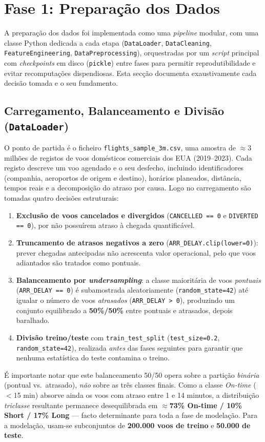 \documentclass[conference]{IEEEtran}
\begin{document}
\section{Fase 1: Preparação dos Dados}
\label{sec:fase1}

A preparação dos dados foi implementada como uma \textit{pipeline} modular,
com uma classe Python dedicada a cada etapa (\texttt{DataLoader},
\texttt{DataCleaning}, \texttt{FeatureEngineering}, \texttt{DataPreprocessing}),
orquestradas por um \textit{script} principal com \textit{checkpoints} em
disco (\texttt{pickle}) entre fases para permitir reprodutibilidade e evitar
recomputações dispendiosas. Esta secção documenta exaustivamente cada decisão
tomada e o seu fundamento.

\subsection{Carregamento, Balanceamento e Divisão (\texttt{DataLoader})}
O ponto de partida é o ficheiro \texttt{flights\_sample\_3m.csv}, uma amostra de
$\approx$3 milhões de registos de voos domésticos comerciais dos EUA
(2019–2023). Cada registo descreve um voo agendado e o seu desfecho, incluindo
identificadores (companhia, aeroportos de origem e destino), horários
planeados, distância, tempos reais e a decomposição do atraso por causa. Logo no
carregamento são tomadas quatro decisões estruturais:
\begin{enumerate}
\item \textbf{Exclusão de voos cancelados e divergidos}
      (\texttt{CANCELLED == 0} e \texttt{DIVERTED == 0}), por não possuírem
      atraso à chegada quantificável.
\item \textbf{Truncamento de atrasos negativos a zero}
      (\texttt{ARR\_DELAY.clip(lower=0)}): prever chegadas antecipadas não
      acrescenta valor operacional, pelo que voos adiantados são tratados como
      pontuais.
\item \textbf{Balanceamento por \textit{undersampling}}: a classe maioritária de
      voos \emph{pontuais} (\texttt{ARR\_DELAY == 0}) é subamostrada
      aleatoriamente (\texttt{random\_state=42}) até igualar o número de voos
      \emph{atrasados} (\texttt{ARR\_DELAY > 0}), produzindo um conjunto
      equilibrado a \textbf{50\%/50\%} entre pontuais e atrasados, depois
      baralhado.
\item \textbf{Divisão treino/teste} com \texttt{train\_test\_split}
      (\texttt{test\_size=0.2}, \texttt{random\_state=42}), realizada \emph{antes}
      das fases seguintes para garantir que nenhuma estatística do teste
      contamina o treino.
\end{enumerate}
É importante notar que este balanceamento 50/50 opera sobre a partição
\emph{binária} (pontual vs.\ atrasado), \emph{não} sobre as três classes finais.
Como a classe \textit{On-time} ($<$15 min) absorve ainda os voos com atraso
entre 1 e 14 minutos, a distribuição \emph{triclasse} resultante permanece
desequilibrada em $\approx$\textbf{73\% On-time / 10\% Short / 17\% Long} — facto
determinante para toda a fase de modelação. Para a modelação, usam-se
subconjuntos de \textbf{200.000 voos de treino} e \textbf{50.000 de teste}.
\end{document}
